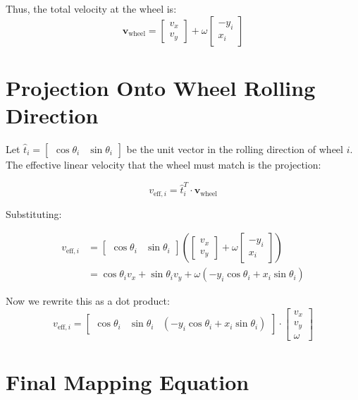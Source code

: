 \documentclass[11pt]{article}
\begin{document}
Thus, the total velocity at the wheel is:
\[
\mathbf{v}_{\text{wheel}} = 
\begin{bmatrix}
v_x \\
v_y
\end{bmatrix}
+
\omega
\begin{bmatrix}
 -y_i \\
 x_i
\end{bmatrix}
\]

\section{Projection Onto Wheel Rolling Direction}

Let \( \hat{t}_i = \begin{bmatrix} \cos\theta_i & \sin\theta_i \end{bmatrix} \) be the unit vector in the rolling direction of wheel \( i \). The effective linear velocity that the wheel must match is the projection:

\[
v_{\text{eff}, i} = 
\hat{t}_i^T \cdot \mathbf{v}_{\text{wheel}}
\]

Substituting:

\begin{align*}
v_{\text{eff}, i} &= \begin{bmatrix}
\cos\theta_i & \sin\theta_i
\end{bmatrix}
\left(
\begin{bmatrix}
v_x \\
v_y
\end{bmatrix}
+
\omega
\begin{bmatrix}
-y_i \\
x_i
\end{bmatrix}
\right) \\
&= \cos\theta_i v_x + \sin\theta_i v_y + \omega(-y_i\cos\theta_i + x_i\sin\theta_i)
\end{align*}

Now we rewrite this as a dot product:
\[
v_{\text{eff}, i} = 
\begin{bmatrix}
\cos\theta_i &
\sin\theta_i &
(-y_i\cos\theta_i + x_i\sin\theta_i)
\end{bmatrix}
\cdot
\begin{bmatrix}
v_x \\
v_y \\
\omega
\end{bmatrix}
\]

\section{Final Mapping Equation}
\end{document}

